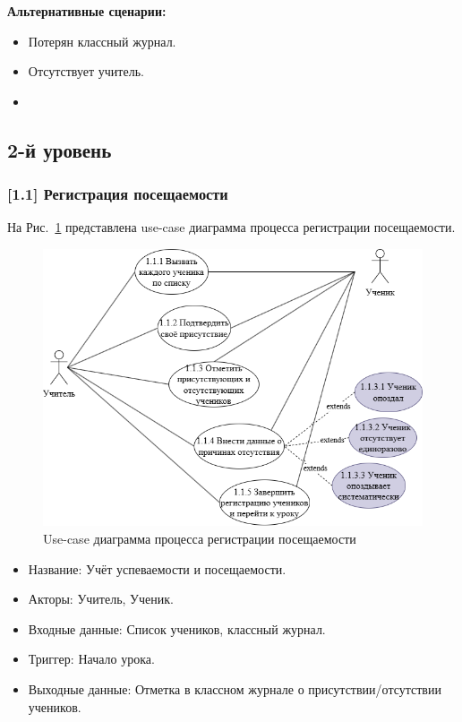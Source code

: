 \documentclass[a4paper, final]{article}
\begin{document}
\textbf{Альтернативные сценарии:}
\begin{itemize}
  \item[1.1.1] Потерян классный журнал.
  \item[1.1.2] Отсутствует учитель.
  \item[1.1.3] 
\end{itemize}

\subsection{2-й уровень}
\subsubsection{[1.1] Регистрация посещаемости}
На Рис.~\ref{img:use_case21} представлена use-case диаграмма процесса регистрации посещаемости.

\begin{figure}[H]
  \centering
  \includegraphics[width=0.85\linewidth]{use_case21.png}
  \caption{Use-case диаграмма процесса регистрации посещаемости}
  \label{img:use_case21}
\end{figure}

\begin{itemize}
  \item Название: Учёт успеваемости и посещаемости.
  \item Акторы: Учитель, Ученик.
  \item Входные данные: Список учеников, классный журнал.
  \item Триггер: Начало урока.
  \item Выходные данные: Отметка в классном журнале о присутствии/отсутствии учеников.
\end{itemize}
\end{document}
